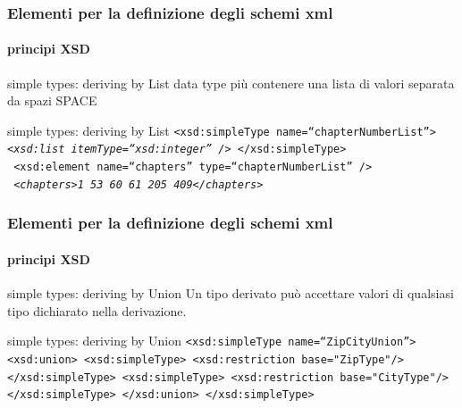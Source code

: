 \begin{frame}
	\frametitle{Elementi per la definizione degli schemi xml}
	\framesubtitle{principi XSD}
	\addtocounter{nframe}{1}

	\begin{block}{simple types: deriving by List}
		data type più contenere una lista di valori separata da spazi SPACE
	\end{block}

	\begin{block}{simple types: deriving by List}
		\texttt{<xsd:simpleType name=``chapterNumberList''>
			\emph{<xsd:list itemType=``xsd:integer'' />}
			</xsd:simpleType>}
		\\\texttt{
			<xsd:element name=``chapters'' type=``chapterNumberList'' />}
		\\\texttt{
			\textit{<chapters>1 53 60 61 205 409</chapters>}}
	\end{block}

\end{frame}

\begin{frame}
	\frametitle{Elementi per la definizione degli schemi xml}
	\framesubtitle{principi XSD}
	\addtocounter{nframe}{1}

	\begin{block}{simple types: deriving by Union}
		Un tipo derivato può accettare valori di qualsiasi tipo dichiarato nella derivazione.
	\end{block}

	\begin{block}{simple types: deriving by Union}
		\texttt{<xsd:simpleType name=``ZipCityUnion''>
			<xsd:union>
			<xsd:simpleType>
			<xsd:restriction base="ZipType"/>
			</xsd:simpleType>
			<xsd:simpleType>
			<xsd:restriction base="CityType"/>
			</xsd:simpleType>
			</xsd:union>
			</xsd:simpleType>}

	\end{block}

\end{frame}





